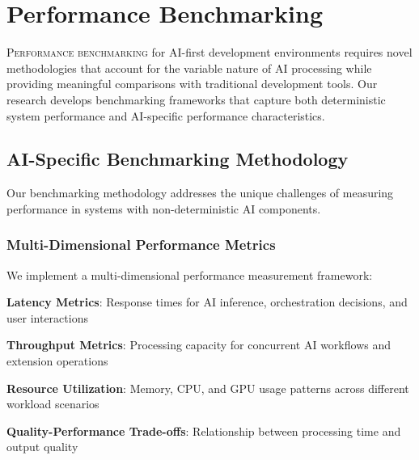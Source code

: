 
\section*{Performance Benchmarking}

\lettrine{P}{erformance benchmarking} for AI-first development environments requires novel methodologies that account for the variable nature of AI processing while providing meaningful comparisons with traditional development tools. Our research develops benchmarking frameworks that capture both deterministic system performance and AI-specific performance characteristics.

\subsection*{AI-Specific Benchmarking Methodology}

Our benchmarking methodology addresses the unique challenges of measuring performance in systems with non-deterministic AI components.

\subsubsection*{Multi-Dimensional Performance Metrics}

We implement a multi-dimensional performance measurement framework:

\begin{expandedlist}
    \item \textbf{Latency Metrics}: Response times for AI inference, orchestration decisions, and user interactions
    \item \textbf{Throughput Metrics}: Processing capacity for concurrent AI workflows and extension operations
    \item \textbf{Resource Utilization}: Memory, CPU, and GPU usage patterns across different workload scenarios
    \item \textbf{Quality-Performance Trade-offs}: Relationship between processing time and output quality
\end{expandedlist}

